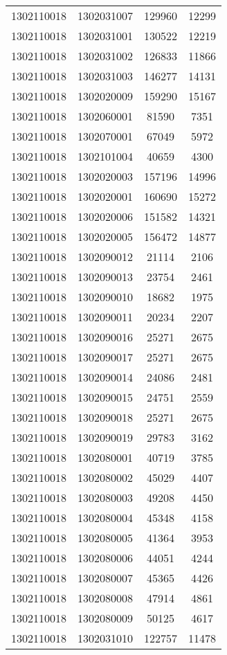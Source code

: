 \begin{longtable}[h]{llcc}
		1302110018 & 1302031007 & 129960 & 12299\\
		1302110018 & 1302031001 & 130522 & 12219\\
		1302110018 & 1302031002 & 126833 & 11866\\
		1302110018 & 1302031003 & 146277 & 14131\\
		1302110018 & 1302020009 & 159290 & 15167\\
		1302110018 & 1302060001 & 81590 & 7351\\
		1302110018 & 1302070001 & 67049 & 5972\\
		1302110018 & 1302101004 & 40659 & 4300\\
		1302110018 & 1302020003 & 157196 & 14996\\
		1302110018 & 1302020001 & 160690 & 15272\\
		1302110018 & 1302020006 & 151582 & 14321\\
		1302110018 & 1302020005 & 156472 & 14877\\
		1302110018 & 1302090012 & 21114 & 2106\\
		1302110018 & 1302090013 & 23754 & 2461\\
		1302110018 & 1302090010 & 18682 & 1975\\
		1302110018 & 1302090011 & 20234 & 2207\\
		1302110018 & 1302090016 & 25271 & 2675\\
		1302110018 & 1302090017 & 25271 & 2675\\
		1302110018 & 1302090014 & 24086 & 2481\\
		1302110018 & 1302090015 & 24751 & 2559\\
		1302110018 & 1302090018 & 25271 & 2675\\
		1302110018 & 1302090019 & 29783 & 3162\\
		1302110018 & 1302080001 & 40719 & 3785\\
		1302110018 & 1302080002 & 45029 & 4407\\
		1302110018 & 1302080003 & 49208 & 4450\\
		1302110018 & 1302080004 & 45348 & 4158\\
		1302110018 & 1302080005 & 41364 & 3953\\
		1302110018 & 1302080006 & 44051 & 4244\\
		1302110018 & 1302080007 & 45365 & 4426\\
		1302110018 & 1302080008 & 47914 & 4861\\
		1302110018 & 1302080009 & 50125 & 4617\\
		1302110018 & 1302031010 & 122757 & 11478\\

\end{longtable}
